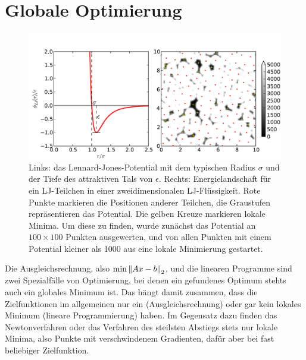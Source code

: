 \afterpage{\raggedbottom
   \clearpage }


\section{Globale Optimierung}

\begin{figure}
  \centering
  \includegraphics[width=\textwidth]{plots/lj}
  \caption{Links: das Lennard-Jones-Potential mit dem typischen Radius
    $\sigma$ und der Tiefe des attraktiven Tals von
    $\epsilon$. Rechts: Energielandschaft für ein LJ-Teilchen in einer
    zweidimensionalen LJ-Flüssigkeit. Rote Punkte markieren die
    Positionen anderer Teilchen, die Graustufen repräsentieren das
    Potential. Die gelben Kreuze markieren lokale Minima. Um diese zu
    finden, wurde zunächst das Potential an $100\times 100$ Punkten
    ausgewerten, und von allen Punkten mit einem Potential kleiner als
    1000 aus eine lokale Minimierung gestartet.}
  \label{fig:ljminima}
\end{figure}

Die Ausgleichsrechnung, also $\min \left\lVert{Ax-b}\right\rVert_2$, und die linearen
Programme sind zwei Spezialfälle von Optimierung, bei denen ein
gefundenes Optimum stehts auch ein globales Minimum ist. Das hängt
damit zusammen, dass die Zielfunktionen im allgemeinen nur ein
(Ausgleichsrechnung) oder gar kein lokales Minimum (lineare
Programmierung) haben. Im Gegensatz dazu finden das Newtonverfahren
oder das Verfahren des steilsten Abstiegs stets nur lokale Minima,
also Punkte mit verschwindenem Gradienten, dafür aber bei fast
beliebiger Zielfunktion.

